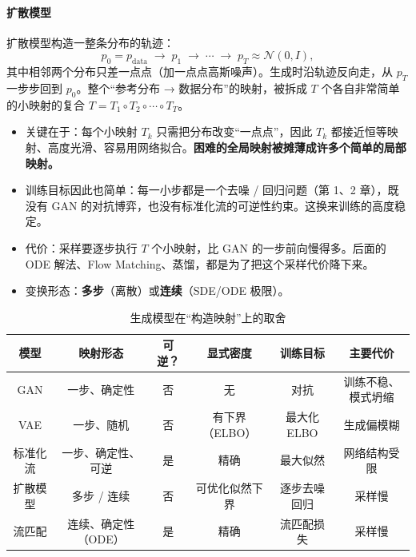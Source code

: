 \paragraph{扩散模型} 扩散模型构造一整条分布的轨迹：
\begin{equation}
p_0 = p_{\text{data}} \;\longrightarrow\; p_1 \;\longrightarrow\; \cdots \;\longrightarrow\; p_T \approx \mathcal{N}(0, I),
\end{equation}
其中相邻两个分布只差一点点（加一点点高斯噪声）。生成时沿轨迹反向走，从 $p_T$ 一步步回到 $p_0$。整个“参考分布 → 数据分布”的映射，被拆成 $T$ 个各自非常简单的小映射的复合 $T = T_1\circ T_2\circ\cdots\circ T_T$。
\begin{itemize}
\item 关键在于：每个小映射 $T_k$ 只需把分布改变“一点点”，因此 $T_k$ 都接近恒等映射、高度光滑、容易用网络拟合。\textbf{困难的全局映射被摊薄成许多个简单的局部映射。}
\item 训练目标因此也简单：每一小步都是一个去噪 / 回归问题（第 1、2 章），既没有 GAN 的对抗博弈，也没有标准化流的可逆性约束。这换来训练的高度稳定。
\item 代价：采样要逐步执行 $T$ 个小映射，比 GAN 的一步前向慢得多。后面的 ODE 解法、Flow Matching、蒸馏，都是为了把这个采样代价降下来。
\item 变换形态：\textbf{多步}（离散）或\textbf{连续}（SDE/ODE 极限）。
\end{itemize}

\begin{table}[htbp]
\centering\small
\begin{tabular}{c|c|c|c|c|c}
\toprule
模型 & 映射形态 & 可逆？ & 显式密度 & 训练目标 & 主要代价 \\
\midrule
GAN & 一步、确定性 & 否 & 无 & 对抗 & 训练不稳、模式坍缩 \\
VAE & 一步、随机 & 否 & 有下界（ELBO） & 最大化 ELBO & 生成偏模糊 \\
标准化流 & 一步、确定性、可逆 & 是 & 精确 & 最大似然 & 网络结构受限 \\
\rowcolor{green!15} 扩散模型 & 多步 / 连续 & 否 & 可优化似然下界 & 逐步去噪回归 & 采样慢 \\
\rowcolor{green!15} 流匹配 & 连续、确定性（ODE） & 是 & 精确 & 流匹配损失 & 采样慢 \\
\bottomrule
\end{tabular}
\caption{生成模型在“构造映射”上的取舍}
\label{tab:generative_models}
\end{table}

